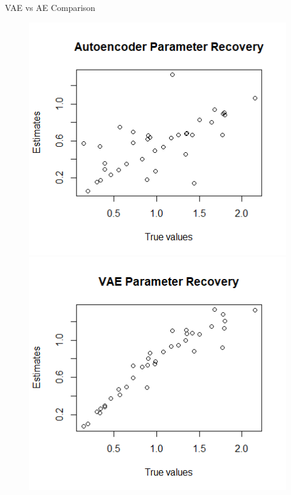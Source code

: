 \documentclass{beamer}
\theoremstyle{definition}
\begin{document}
\begin{frame}{VAE vs AE Comparison}
\begin{figure}[h!]
    \includegraphics[width=\textwidth]{img/aied_results/ae_a_corr.png}
\endminipage\hfill
{}
    \includegraphics[width=\textwidth]{img/aied_results/vae_a_corr.png}
\endminipage\hfill


\end{figure}
\end{frame}
\end{document}
